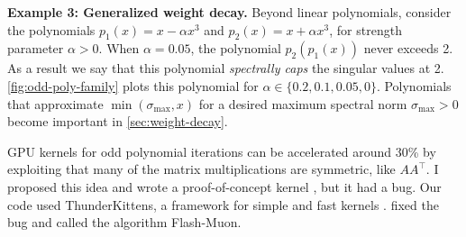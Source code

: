 \textbf{Example 3: Generalized weight decay.} Beyond linear polynomials, consider the polynomials $p_1(x) = x - \alpha x^3$ and $p_2(x) = x + \alpha x^3$, for strength parameter $\alpha > 0$. When $\alpha = 0.05$, the polynomial $p_2(p_1(x))$ never exceeds 2. As a result we say that this polynomial \textit{spectrally caps} the singular values at 2. \cref{fig:odd-poly-family} plots this polynomial for $\alpha \in \{0.2, 0.1, 0.05, 0\}$. Polynomials that approximate $\min(\sigma_\text{max}, x)$ for a desired maximum spectral norm $\sigma_\text{max} > 0$ become important in \cref{sec:weight-decay}.

\begin{notebox}
    GPU kernels for odd polynomial iterations can be accelerated around 30\% by exploiting that many of the matrix multiplications are symmetric, like $AA^\top$. I proposed this idea and wrote a proof-of-concept kernel \citep{newhouse2024symmetric}, but it had a bug. Our code used ThunderKittens, a framework for simple and fast kernels \citep{spector2024thunderkittens}. \citet{lin2025flash} fixed the bug and called the algorithm Flash-Muon.
\end{notebox}